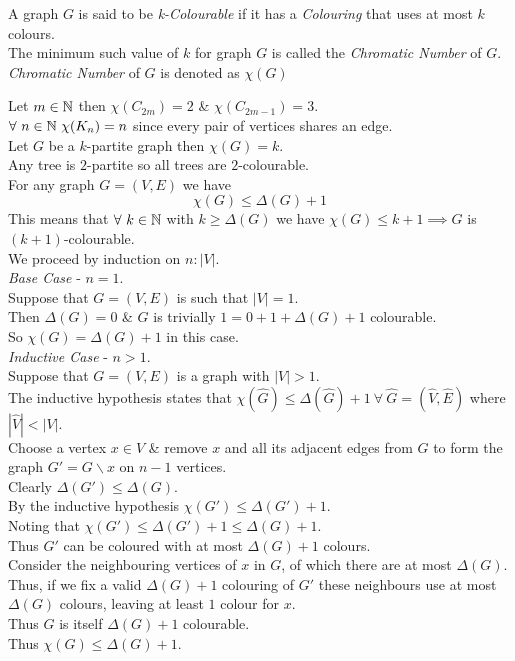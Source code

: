 \documentclass[11pt,a4paper]{article}
\begin{document}
A graph $G$ is said to be \textit{k-Colourable} if it has a \textit{Colouring} that uses at most $k$ colours.\\
The minimum such value of $k$ for graph $G$ is called the \textit{Chromatic Number} of $G$.\\
\nb \textit{Chromatic Number} of $G$ is denoted as $\chi(G)$

Let $m\in\mathbb{N}$ then $\chi(C_{2m})=2$ \& $\chi(C_{2m-1})=3$.\\
$\forall\ n\in\mathbb{N}\ \chi(K_n)=n$ since every pair of vertices shares an edge.\\
Let $G$ be a $k$-partite graph then $\chi(G)=k$.\\
Any tree is $2$-partite so all trees are $2$-colourable.\\

For any graph $G=(V,E)$ we have
$$\chi(G)\leq\Delta(G)+1$$
This means that $\forall\ k\in\mathbb{N}$ with $k\geq\Delta(G)$ we have $\chi(G)\leq k+1\implies G$ is $(k+1)$-colourable.\\

We proceed by induction on $n:|V|$.\\
\textit{Base Case} - $n=1$.\\
Suppose that $G=(V,E)$ is such that $|V|=1$.\\
Then $\Delta(G)=0$ \& $G$ is trivially $1=0+1+\Delta(G)+1$ colourable.\\
So $\chi(G)=\Delta(G)+1$ in this case.\\
\textit{Inductive Case} - $n>1$.\\
Suppose that $G=(V,E)$ is a graph with $|V|>1$.\\
The inductive hypothesis states that $\chi(\hat{G})\leq\Delta(\hat{G})+1\ \forall\ \hat{G}=(\hat{V},\hat{E})$ where $|\hat{V}|<|V|$.\\
Choose a vertex $x\in V$ \& remove $x$ and all its adjacent edges from $G$ to form the graph $G'=G\backslash x$ on $n-1$ vertices.\\
Clearly $\Delta(G')\leq\Delta(G)$.\\
By the inductive hypothesis $\chi(G')\leq\Delta(G')+1$.\\
Noting that $\chi(G')\leq\Delta(G')+1\leq\Delta(G)+1$.\\
Thus $G'$ can be coloured with at most $\Delta(G)+1$ colours.\\
Consider the neighbouring vertices of $x$ in $G$, of which there are at most $\Delta(G)$.\\
Thus, if we fix a valid $\Delta(G)+1$ colouring of $G'$ these neighbours use at most $\Delta(G)$ colours, leaving at least $1$ colour for $x$.\\
Thus $G$ is itself $\Delta(G)+1$ colourable.\\
Thus $\chi(G)\leq\Delta(G)+1$.\\
\end{document}
